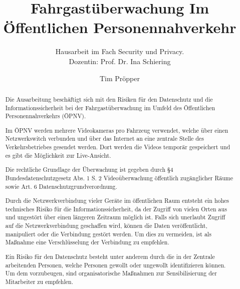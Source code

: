 \documentclass[runningheads]{llncs}
\begin{document}
\title{Fahrgastüberwachung Im Öffentlichen Personennahverkehr}
\subtitle{Hausarbeit im Fach \glqq{}Security und Privacy\grqq{}.\\Dozentin: Prof. Dr. Ina Schiering}
\author{Tim Pröpper}

{\def\addcontentsline#1#2#3{}\maketitle}            %


\begin{abstract}
    Die Ausarbeitung beschäftigt sich mit den Risiken für den Datenschutz und die Informationssicherheit bei der Fahrgastüberwachung im Umfeld des
    Öffentlichen Personennahverkehrs (ÖPNV).

    Im ÖPNV werden mehrere Videokameras pro Fahrzeug verwendet, welche über einen Netzwerkswitch verbunden und über das Internet an eine zentrale Stelle des Verkehrsbetriebes gesendet werden.
    Dort werden die Videos temporär gespeichert und es gibt die Möglichkeit zur \glqq{}Live-Ansicht\grqq{}.

    Die rechtliche Grundlage der Überwachung ist gegeben durch
    §4 Bundesdatenschutzgesetz Abs. 1 S. 2 \glqq{}Videoüberwachung öffentlich zugänglicher Räume\grqq{} sowie Art. 6 Datenschutzgrundverordnung.

    Durch die Netzwerkverbindung vieler Geräte im öffentlichen Raum entsteht ein hohes technisches Risiko für die Informationssicherheit, da der Zugriff von vielen Orten aus und ungestört über einen
    längeren Zeitraum möglich ist. Falls sich unerlaubt Zugriff auf die Netzwerkverbindung geschaffen wird, können die Daten veröffentlicht, manipuliert oder die Verbindung gestört werden.
    Um dies zu vermeiden, ist als Maßnahme eine Verschlüsselung der Verbindung zu empfehlen.

    Ein Risiko für den Datenschutz besteht unter anderem durch die in der Zentrale arbeitenden Personen, welche Personen gewollt oder ungewollt identifizieren können. Um dem vorzubeugen, sind
    organisatorische Maßnahmen zur Sensibilisierung der Mitarbeiter zu empfehlen.
\end{abstract}

\setcounter{tocdepth}{2}
\tableofcontents
\setcounter{page}{0}







\end{document}
